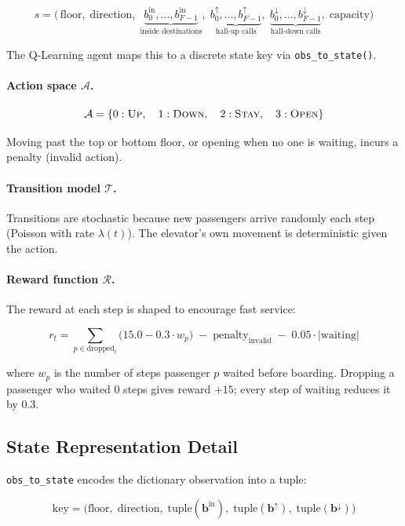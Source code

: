 \documentclass[12pt,a4paper]{article}
\begin{document}
\[
s = \bigl(\,\text{floor},\;
           \text{direction},\;
           \underbrace{b_0^{\text{in}},\ldots,b_{F-1}^{\text{in}}}_{\text{inside destinations}},\;
           \underbrace{b_0^{\uparrow},\ldots,b_{F-1}^{\uparrow}}_{\text{hall-up calls}},\;
           \underbrace{b_0^{\downarrow},\ldots,b_{F-1}^{\downarrow}}_{\text{hall-down calls}},\;
           \text{capacity}\bigr)
\]

The Q-Learning agent maps this to a discrete state key via \texttt{obs\_to\_state()}.

\paragraph{Action space $\mathcal{A}$.}

\[
\mathcal{A} = \{0:\textsc{Up},\quad 1:\textsc{Down},\quad 2:\textsc{Stay},\quad 3:\textsc{Open}\}
\]

Moving past the top or bottom floor, or opening when no one is waiting, incurs a
penalty (invalid action).

\paragraph{Transition model $\mathcal{T}$.}
Transitions are stochastic because new passengers arrive randomly each step
(Poisson with rate $\lambda(t)$).  The elevator's own movement is deterministic
given the action.

\paragraph{Reward function $\mathcal{R}$.}
The reward at each step is shaped to encourage fast service:

\[
r_t = \sum_{p \in \text{dropped}_t}\!\!\bigl(15.0 - 0.3 \cdot w_p\bigr)
    \;-\; \text{penalty}_{\text{invalid}}
    \;-\; 0.05 \cdot |\text{waiting}|
\]

where $w_p$ is the number of steps passenger $p$ waited before boarding.
Dropping a passenger who waited 0 steps gives reward $+15$; every step of
waiting reduces it by $0.3$.

\subsection{State Representation Detail}

\texttt{obs\_to\_state} encodes the dictionary observation into a tuple:

\[
\text{key} = \bigl(\text{floor},\; \text{direction},\;
\text{tuple}(\mathbf{b}^{\text{in}}),\;
\text{tuple}(\mathbf{b}^{\uparrow}),\;
\text{tuple}(\mathbf{b}^{\downarrow})\bigr)
\]
\end{document}
